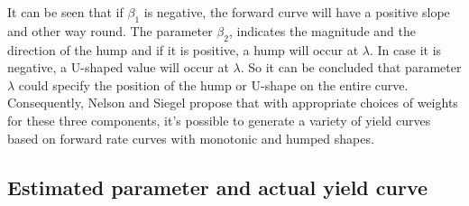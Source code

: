\documentclass{article}
\begin{document}
\begin{spacing}{1.5}
It can be seen that if $\beta_1$ is negative, the forward curve will have a positive slope and other way round. The parameter $\beta_2$, indicates the magnitude and the direction of the hump and if it is positive, a hump will occur at $\lambda$. In case it is negative, a U-shaped value will occur at $\lambda$. So it can be concluded that parameter $\lambda$ could specify the position of the hump or U-shape on the entire curve. Consequently, Nelson and Siegel propose that with appropriate choices of weights for these three components, it's possible to generate a variety of yield curves based on forward rate curves with monotonic and humped shapes.

\subsection{Estimated parameter and actual yield curve}



\end{spacing}
\end{document}
